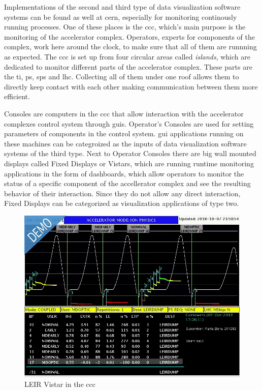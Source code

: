 \cite{LhcDataStorage, LhcRun2, AtlasLiveCollisions, AtlasTrigger}

Implementations of the second and third type of data visualization software
systems can be found as well at \gls{cern}, especially for monitoring
continously running processes. One of these places is the \gls{ccc}, which's
main purpose is the monitoring of the accelerator complex. Operators, experts
for components of the complex, work here around the clock, to make sure that all
of them are runnning as expected. The \gls{ccc} is set up from four circular
areas called \emph{islands}, which are dedicated to monitor different parts of
the accelerator complex. These parts are the \gls{ti}, \gls{ps}, \gls{sps} and
\gls{lhc}. Collecting all of them under one roof allows them to directly keep
contact with each other making communication between them more efficient.

\cite{DayInCCC}

Consoles are computers in the \gls{ccc} that allow interaction with the
accelerator complexes control system through \glspl{gui}. Operator's Consoles
are used for setting parameters of components in the control system. \gls{gui}
applications running on these machines can be categroized as the inputs of data
visualization software systems of the third type.  Next to Operator Consoles
there are big wall mounted displays called Fixed Displays or Vistars, which are
running runtime monitoring applications in the form of dashboards, which allow
operators to monitor the status of a specific component of the accellerator
complex and see the resulting behavior of their interaction. Since they do not
allow any direct interaction, Fixed Displays can be categorized as visualization
applications of type two.

\cite{ControlSystemBible}

\begin{figure}[h]
    \centering
    \includegraphics[width=12cm]{resources/img/LEIRVistar}
    \caption{LEIR Vistar in the \gls{ccc}}
    \label{fig:leir}
\end{figure}

